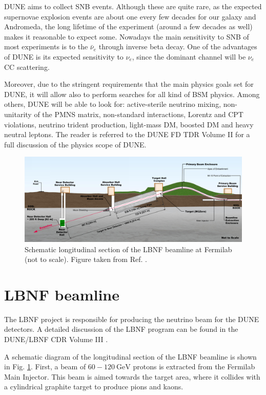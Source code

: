 DUNE aims to collect SNB events. Although these are quite rare, as the expected supernovae explosion events are about one every few decades for our galaxy and Andromeda, the long lifetime of the experiment (around a few decades as well) makes it reasonable to expect some. Nowadays the main sensitivity to SNB of most experiments is to the $\bar{\nu}_{e}$ through inverse beta decay. One of the advantages of DUNE is its expected sensitivity to $\nu_{e}$, since the dominant channel will be $\nu_{e}$ CC scattering.

Moreover, due to the stringent requirements that the main physics goals set for DUNE, it will allow also to perform searches for all kind of BSM physics. Among others, DUNE will be able to look for: active-sterile neutrino mixing, non-unitarity of the PMNS matrix, non-standard interactions, Lorentz and CPT violations, neutrino trident production, light-mass DM, boosted DM and heavy neutral leptons. The reader is referred to the DUNE FD TDR Volume II \cite{DUNE2020TDR2} for a full discussion of the physics scope of DUNE.

\begin{figure}[t]
	\centering
	\includegraphics[width=0.95\linewidth]{Images/DUNE/LBNF/beamline-sideview}
	\caption[Schematic longitudinal section of the LBNF beamline at Fermilab.]{Schematic longitudinal section of the LBNF beamline at Fermilab (not to scale). Figure taken from Ref. \cite{DUNE2016CDR3}.}
	\label{fig:lbnf_beamline}
\end{figure}

\section{LBNF beamline}

The LBNF project is responsible for producing the neutrino beam for the DUNE detectors. A detailed discussion of the LBNF program can be found in the DUNE/LBNF CDR Volume III \cite{DUNE2016CDR3}.

A schematic diagram of the longitudinal section of the LBNF beamline is shown in Fig. \ref{fig:lbnf_beamline}. First, a beam of $60-120~\mathrm{GeV}$ protons is extracted from the Fermilab Main Injector. This beam is aimed towards the target area, where it collides with a cylindrical graphite target to produce pions and kaons.

